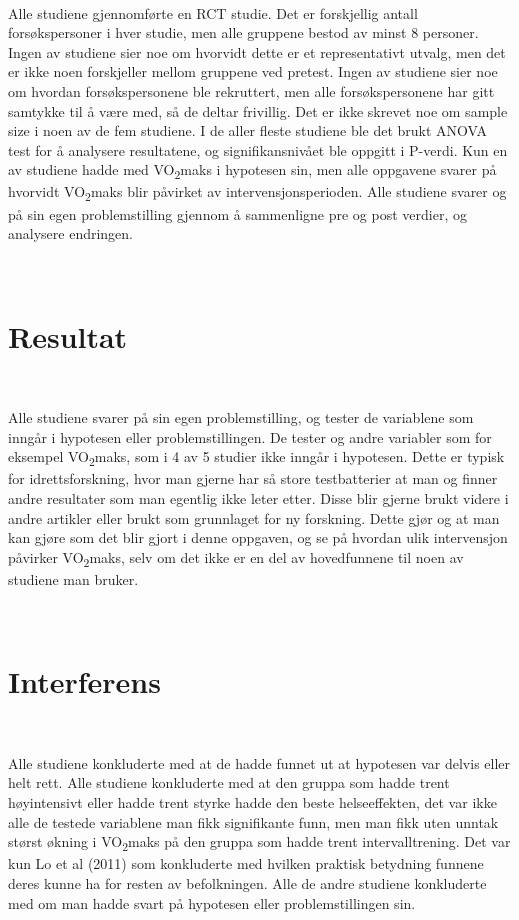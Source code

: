 \documentclass[
]{article}
\begin{document}
~

Alle studiene gjennomførte en RCT studie. Det er forskjellig antall
forsøkspersoner i hver studie, men alle gruppene bestod av minst 8
personer. Ingen av studiene sier noe om hvorvidt dette er et
representativt utvalg, men det er ikke noen forskjeller mellom gruppene
ved pretest. Ingen av studiene sier noe om hvordan forsøkspersonene ble
rekruttert, men alle forsøkspersonene har gitt samtykke til å være med,
så de deltar frivillig. Det er ikke skrevet noe om sample size i noen av
de fem studiene. I de aller fleste studiene ble det brukt ANOVA test for
å analysere resultatene, og signifikansnivået ble oppgitt i P-verdi. Kun
en av studiene hadde med VO\textsubscript{2}maks i hypotesen sin, men
alle oppgavene svarer på hvorvidt VO\textsubscript{2}maks blir påvirket
av intervensjonsperioden. Alle studiene svarer og på sin egen
problemstilling gjennom å sammenligne pre og post verdier, og analysere
endringen.

~

\hypertarget{resultat}{%
\section{Resultat}\label{resultat}}

~

Alle studiene svarer på sin egen problemstilling, og tester de
variablene som inngår i hypotesen eller problemstillingen. De tester og
andre variabler som for eksempel VO\textsubscript{2}maks, som i 4 av 5
studier ikke inngår i hypotesen. Dette er typisk for idrettsforskning,
hvor man gjerne har så store testbatterier at man og finner andre
resultater som man egentlig ikke leter etter. Disse blir gjerne brukt
videre i andre artikler eller brukt som grunnlaget for ny forskning.
Dette gjør og at man kan gjøre som det blir gjort i denne oppgaven, og
se på hvordan ulik intervensjon påvirker VO\textsubscript{2}maks, selv
om det ikke er en del av hovedfunnene til noen av studiene man bruker.

~

\hypertarget{interferens}{%
\section{Interferens}\label{interferens}}

~

Alle studiene konkluderte med at de hadde funnet ut at hypotesen var
delvis eller helt rett. Alle studiene konkluderte med at den gruppa som
hadde trent høyintensivt eller hadde trent styrke hadde den beste
helseeffekten, det var ikke alle de testede variablene man fikk
signifikante funn, men man fikk uten unntak størst økning i
VO\textsubscript{2}maks på den gruppa som hadde trent intervalltrening.
Det var kun Lo et al (2011) som konkluderte med hvilken praktisk
betydning funnene deres kunne ha for resten av befolkningen. Alle de
andre studiene konkluderte med om man hadde svart på hypotesen eller
problemstillingen sin.
\end{document}
